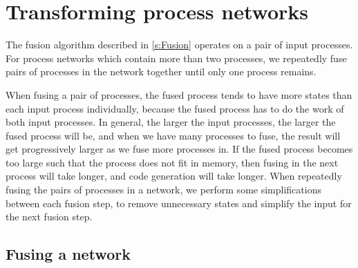 \section{Transforming process networks}
\label{s:Optimisation}

The fusion algorithm described in \cref{s:Fusion} operates on a pair of input processes.
For process networks which contain more than two processes, we repeatedly fuse pairs of processes in the network together until only one process remains.

When fusing a pair of processes, the fused process tends to have more states than each input process individually, because the fused process has to do the work of both input processes.
In general, the larger the input processes, the larger the fused process will be, and when we have many processes to fuse, the result will get progressively larger as we fuse more processes in.
If the fused process becomes too large such that the process does not fit in memory, then fusing in the next process will take longer, and code generation will take longer.
When repeatedly fusing the pairs of processes in a network, we perform some simplifications between each fusion step, to remove unnecessary states and simplify the input for the next fusion step.



\subsection{Fusing a network}
\label{ss:Fusing:a:network}

